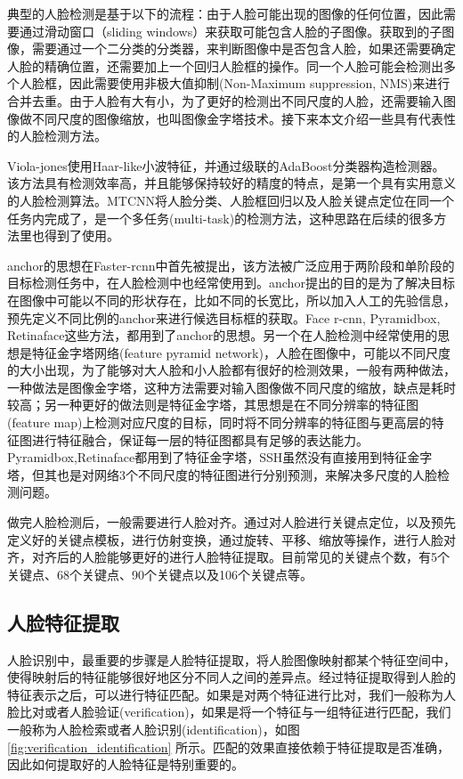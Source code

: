 典型的人脸检测是基于以下的流程：由于人脸可能出现的图像的任何位置，因此需要通过滑动窗口（sliding windows）来获取可能包含人脸的子图像。获取到的子图像，需要通过一个二分类的分类器，来判断图像中是否包含人脸，如果还需要确定人脸的精确位置，还需要加上一个回归人脸框的操作。同一个人脸可能会检测出多个人脸框，因此需要使用非极大值抑制(Non-Maximum suppression, NMS)来进行合并去重。由于人脸有大有小，为了更好的检测出不同尺度的人脸，还需要输入图像做不同尺度的图像缩放，也叫图像金字塔技术。接下来本文介绍一些具有代表性的人脸检测方法。

Viola-jones\cite{viola2001rapid}使用Haar-like小波特征，并通过级联的AdaBoost分类器构造检测器。该方法具有检测效率高，并且能够保持较好的精度的特点，是第一个具有实用意义的人脸检测算法。MTCNN\cite{zhang2016joint}将人脸分类、人脸框回归以及人脸关键点定位在同一个任务内完成了，是一个多任务(multi-task)的检测方法，这种思路在后续的很多方法里也得到了使用。

anchor的思想在Faster-rcnn\cite{ren2015faster}中首先被提出，该方法被广泛应用于两阶段和单阶段的目标检测任务中，在人脸检测中也经常使用到。anchor提出的目的是为了解决目标在图像中可能以不同的形状存在，比如不同的长宽比，所以加入人工的先验信息，预先定义不同比例的anchor来进行候选目标框的获取。Face r-cnn\cite{wang2017face}, Pyramidbox\cite{tang2018pyramidbox}, Retinaface\cite{deng2019retinaface}这些方法，都用到了anchor的思想。另一个在人脸检测中经常使用的思想是特征金字塔网络(feature pyramid network)，人脸在图像中，可能以不同尺度的大小出现，为了能够对大人脸和小人脸都有很好的检测效果，一般有两种做法，一种做法是图像金字塔，这种方法需要对输入图像做不同尺度的缩放，缺点是耗时较高；另一种更好的做法则是特征金字塔，其思想是在不同分辨率的特征图(feature map)上检测对应尺度的目标，同时将不同分辨率的特征图与更高层的特征图进行特征融合，保证每一层的特征图都具有足够的表达能力。Pyramidbox,Retinaface都用到了特征金字塔，SSH\cite{najibi2017ssh}虽然没有直接用到特征金字塔，但其也是对网络3个不同尺度的特征图进行分别预测，来解决多尺度的人脸检测问题。

做完人脸检测后，一般需要进行人脸对齐。通过对人脸进行关键点定位，以及预先定义好的关键点模板，进行仿射变换，通过旋转、平移、缩放等操作，进行人脸对齐，对齐后的人脸能够更好的进行人脸特征提取。目前常见的关键点个数，有5个关键点、68个关键点、90个关键点以及106个关键点等。

\subsection{人脸特征提取}
人脸识别中，最重要的步骤是人脸特征提取，将人脸图像映射都某个特征空间中，使得映射后的特征能够很好地区分不同人之间的差异点。经过特征提取得到人脸的特征表示之后，可以进行特征匹配。如果是对两个特征进行比对，我们一般称为人脸比对或者人脸验证(verification)，如果是将一个特征与一组特征进行匹配，我们一般称为人脸检索或者人脸识别(identification)，如图 \ref{fig:verification_identification} 所示。匹配的效果直接依赖于特征提取是否准确，因此如何提取好的人脸特征是特别重要的。


